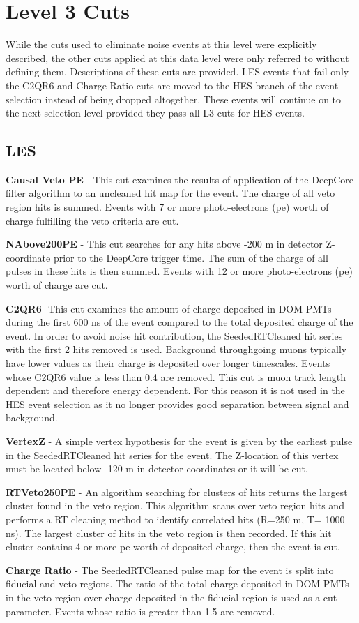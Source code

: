 \documentclass{gatech-thesis}
\begin{document}
\section{Level 3 Cuts}
While the cuts used to eliminate noise events at this level were explicitly described, the other cuts applied at this data level were only referred to without defining them. Descriptions of these cuts are provided. LES events that fail only the C2QR6 and Charge Ratio cuts are moved to the HES branch of the event selection instead of being dropped altogether. These events will continue on to the next selection level provided they pass all L3 cuts for HES events.
\subsection{LES}
\begin{adjustwidth}{1.5em}{1.5em}
\setlength{\parindent}{0pt}
\textbf{Causal Veto PE} - This cut examines the results of application of the DeepCore filter algorithm to an uncleaned hit map for the event. The charge of all veto region hits is summed. Events with 7 or more photo-electrons (pe) worth of charge fulfilling the veto criteria are cut.

\textbf{NAbove200PE} - This cut searches for any hits above -200 m in detector Z-coordinate prior to the DeepCore trigger time. The sum of the charge of all pulses in these hits is then summed. Events with 12 or more photo-electrons (pe) worth of charge are cut.

\textbf{C2QR6} -This cut examines the amount of charge deposited in DOM PMTs during the first 600 ns of the event compared to the total deposited charge of the event. In order to avoid noise hit contribution, the SeededRTCleaned hit series with the first 2 hits removed is used. Background throughgoing muons typically have lower values as their charge is deposited over longer timescales. Events whose C2QR6 value is less than 0.4 are removed. This cut is muon track length dependent and therefore energy dependent. For this reason it is not used in the HES event selection as it no longer provides good separation between signal and background.

\textbf{VertexZ} - A simple vertex hypothesis for the event is given by the earliest pulse in the SeededRTCleaned hit series for the event. The Z-location of this vertex must be located below -120 m in detector coordinates or it will be cut. 

\textbf{RTVeto250PE} - An algorithm searching for clusters of hits returns the largest cluster found in the veto region. This algorithm scans over veto region hits and performs a RT cleaning method to identify correlated hits (R=250 m, T= 1000 ns). The largest cluster of hits in the veto region is then recorded. If this hit cluster contains 4 or more pe worth of deposited charge, then the event is cut.

\textbf{Charge Ratio} - The SeededRTCleaned pulse map for the event is split into fiducial and veto regions. The ratio of the total charge deposited in DOM PMTs in the veto region over charge deposited in the fiducial region is used as a cut parameter. Events whose ratio is greater than 1.5 are removed.

\end{adjustwidth}
\end{document}
